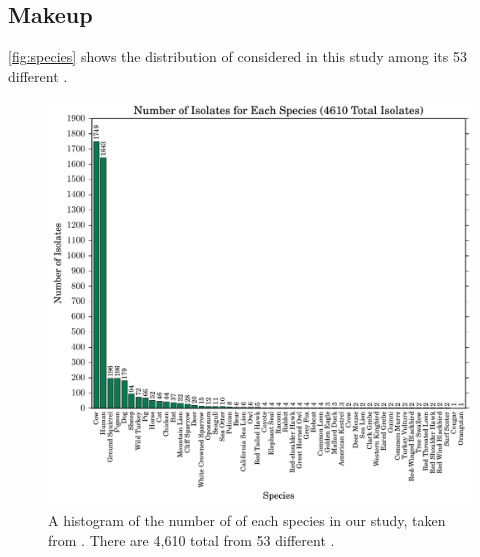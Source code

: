 \subsection{\cplop{} Makeup}
\autoref{fig:species} shows the distribution of \cplop{} \isols{} considered in this study among its 53 different \spec{}.
\begin{figure}[t]
    \centering
    \includegraphics[width=\linewidth]{figures/bs/species_hist.pdf}
    \caption{
    A histogram of the number of \isols{} of each species in our study, taken from \cplop{}.
    There are 4,610 total \isols{} from 53 different \specs{}.}
    \label{fig:species}
\end{figure}

